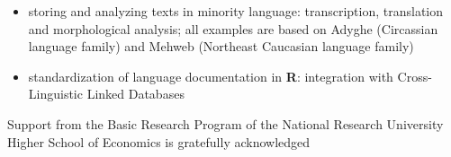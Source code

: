 \documentclass[11pt, a4paper]{article}
\providecommand{\tightlist}{%
  \setlength{\itemsep}{0pt}\setlength{\parskip}{0pt}}
\begin{document}
\begin{itemize}
\tightlist
\item
  storing and analyzing texts in minority language: transcription,
  translation and morphological analysis; all examples are based on
  Adyghe (Circassian language family) and Mehweb (Northeast Caucasian
  language family)
\item
  standardization of language documentation in \textbf{R}: integration
  with Cross-Linguistic Linked Databases
\end{itemize}

Support from the Basic Research Program of the National Research
University Higher School of Economics is gratefully acknowledged
\end{document}
